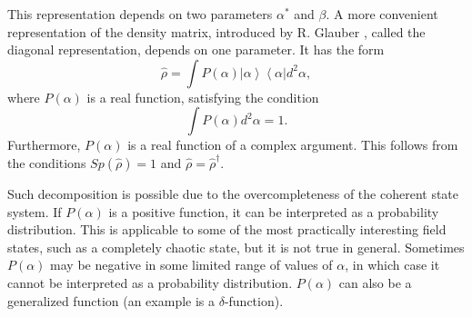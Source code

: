 This representation depends on two parameters $\alpha^{*}$ and $\beta$. A more convenient representation of the density matrix, introduced by R. Glauber \cite{bQuantumOpticsAndRadioPhisicsLecture1966}, called the diagonal representation, depends on one parameter. It has the form 
\begin{equation}
\hat{\rho} = \int
P\left(\alpha\right)\left|\alpha\right>\left<\alpha\right| d^2 \alpha,
\label{eqCh1_rhorepresent}
\end{equation}
where $P\left(\alpha\right)$ is a real function, satisfying the condition 
\[
\int
P\left(\alpha\right) d^2 \alpha = 1.
\]
Furthermore, $P\left(\alpha\right)$ is a real function of a complex argument. This follows from the conditions $Sp\left(\hat{\rho}\right) = 1$ and $\hat{\rho} = \hat{\rho}^{\dag}$.
 
Such decomposition is possible due to the overcompleteness of the coherent state system. If $P\left(\alpha\right)$ is a positive function, it can be interpreted as a probability distribution. This is applicable to some of the most practically interesting field states, such as a completely chaotic state, but it is not true in general. Sometimes $P\left(\alpha\right)$ may be negative in some limited range of values of $\alpha$, in which case it cannot be interpreted as a probability distribution. $P\left(\alpha\right)$ can also be a generalized function (an example is a $\delta$-function). 

